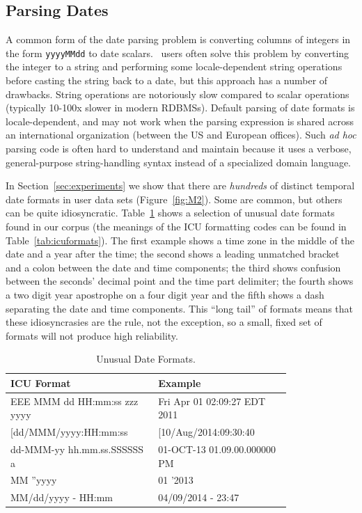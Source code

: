 \subsection{Parsing Dates}
A common form of the date parsing problem is converting columns of integers in the form \texttt{yyyyMMdd} to date scalars. \Naive\ users often solve this problem by converting the integer to a string and performing some locale-dependent string operations before casting the string back to a date, but this approach has a number of drawbacks. String operations are notoriously slow compared to scalar operations (typically 10-100x slower in modern RDBMSs). Default parsing of date formats is locale-dependent, and may not work when the parsing expression is shared across an international organization (\eg between the US and European offices). Such \textit{ad hoc} parsing code is often hard to understand and maintain because it uses a verbose, general-purpose string-handling syntax instead of a specialized domain language.

In Section~\ref{sec:experiments} we show that there are \textit{hundreds} of distinct temporal date formats in user data sets (Figure~\ref{fig:M2}).
Some are common, but others can be quite idiosyncratic. 
Table~\ref{tab:dateformats} shows a selection of unusual date formats found in our corpus (the meanings of the ICU formatting codes can be found in Table~\ref{tab:icuformats}). 
The first example shows a time zone in the middle of the date and a year after the time; 
the second shows a leading unmatched bracket and a colon between the date and time components; 
the third shows confusion between the seconds' decimal point and the time part delimiter; 
the fourth shows a two digit year apostrophe on a four digit year and the fifth shows a dash separating the date and time components. 
This ``long tail'' of formats means that these idiosyncrasies are the rule, not the exception, 
so a small, fixed set of formats will not produce high reliability.

\begin{table}[ht]
\centering
\bgroup
\def\arraystretch{1.5}
\begin{tabular}{|p{0.4\linewidth}| p{0.4\linewidth}|}
\hline
\centering
\textbf{ICU Format} & \textbf{Example}\\ \hline
\scriptsize{EEE MMM dd HH:mm:ss zzz yyyy} & \scriptsize{Fri Apr 01 02:09:27 EDT 2011}\\ \hline
\scriptsize{[dd/MMM/yyyy:HH:mm:ss} & \scriptsize{[10/Aug/2014:09:30:40}\\ \hline
\scriptsize{dd-MMM-yy hh.mm.ss.SSSSSS a} & \scriptsize{01-OCT-13 01.09.00.000000 PM}\\ \hline
\scriptsize{MM ''yyyy} & \scriptsize{01 '2013}\\ \hline
\scriptsize{MM/dd/yyyy - HH:mm} & \scriptsize{04/09/2014 - 23:47}\\ \hline
\end{tabular}
\egroup
\caption{Unusual Date Formats.}
\label{tab:dateformats}
\end{table}

